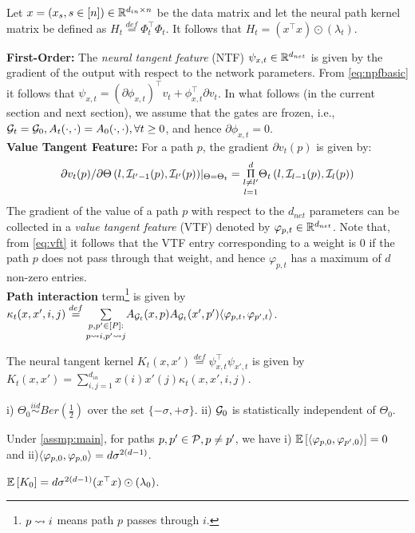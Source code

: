 \begin{lemma} Let $x=(x_s,s\in [n])\in\R^{d_{in}\times n}$ be the data matrix and let the neural path kernel matrix be defined as $H_t\stackrel{def}=\Phi^\top_t\Phi_t$. It follows that $H_t= (x^\top x)\odot(\lambda_t)$. \end{lemma}
\textbf{First-Order:} The \emph{neural tangent feature} (NTF) $\psi_{x,t}\in \R^{d_{net}}$ is given by the gradient of the output with respect to the network parameters. From \eqref{eq:npfbasic} it follows that $\psi_{x,t}=(\partial \phi_{x,t})^\top v_t +\phi^\top_{x,t}\partial v_t$. In what follows (in the current section and next section), we assume that the gates are frozen, i.e., $\G_t=\G_0, A_t(\cdot,\cdot)=A_0(\cdot,\cdot),\forall t\geq 0$, and hence $\partial \phi_{x,t}=0$.\hfill\\
\textbf{Value Tangent Feature:} For a path $p$, the gradient  $\partial v_t(p)$ is given by: \begin{align}\label{eq:vft}{\partial v_t(p)}/{\partial \Theta\left(l,\I_{l'-1}(p),\I_{l'}(p)\right)}|_{\Theta=\Theta_t}= \underset{l=1}{\underset{l\neq l'}{\overset{d}{\Pi}}} \Theta_t\left(l,\I_{l-1}(p),\I_{l}(p)\right)\end{align} The gradient of the value of a path $p$ with respect to the $d_{net}$ parameters can be collected in a \emph{value tangent feature} (VTF) denoted by $\varphi_{p,t}\in \R^{d_{net}}$. Note that, from \eqref{eq:vft} it follows that the VTF entry corresponding to a weight is $0$ if the path $p$ does not pass through that weight, and hence $\varphi_{p,t}$ has a maximum of $d$ non-zero entries.\hfill\\
\textbf{Path interaction} term\footnote{$p\rsa i$ means path $p$ passes through $i$.} is given by $\kappa_t(x,x',i,j)\stackrel{def}=\underset{p\rsa i,p'\rsa j}{\underset{{p,p'\in [P]:}}\sum} A_{\G_t}(x,p) A_{\G_t}(x',p') \ip{\varphi_{p,t}, \varphi_{p',t}}$. 
\begin{lemma} The {neural tangent kernel} $K_t(x,x')\stackrel{def}=\psi^\top_{x,t}\psi_{x',t}$ is given by $K_t(x,x')=\sum_{i,j=1}^{d_{in}} x(i)x'(j) \kappa_t(x,x',i,j)$.
\end{lemma}
\begin{assumption}\label{assmp:main}
i) $\Theta_0\stackrel{iid}\sim Ber\left(\frac{1}{2}\right)$ over the set $\{-\sigma,+\sigma\}$. ii) $\G_0$ is statistically independent of $\Theta_0$.
\end{assumption}
\begin{lemma}[Disentanglement]
Under \cref{assmp:main}, for paths $p,p'\in \P, p\neq p'$, we have  i) $\E{\ip{\varphi_{p,0}, \varphi_{p',0}}}= 0$ and ii)${\ip{\varphi_{p,0}, \varphi_{p,0}}}= d\sigma^{2(d-1)}$.
\end{lemma}
\begin{corollary}
$\E{K_0}=d\sigma^{2(d-1)}(x^\top x) \odot (\lambda_0)$.
\end{corollary}

